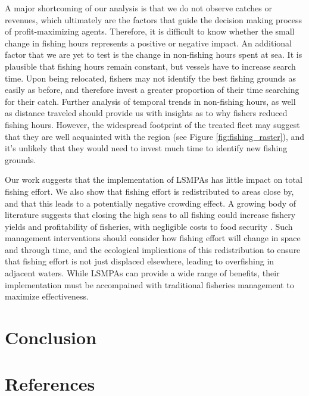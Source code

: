 \documentclass[9pt,twoside,lineno]{pnas-new}
\begin{document}
A major shortcoming of our analysis is that we do not observe catches or
revenues, which ultimately are the factors that guide the decision
making process of profit-maximizing agents. Therefore, it is difficult
to know whether the small change in fishing hours represents a positive or
negative impact. An additional factor that we are yet to test is the
change in non-fishing hours spent at sea. It is plausible that fishing
hours remain constant, but vessels have to increase search time. Upon
being relocated, fishers may not identify the best fishing grounds as
easily as before, and therefore invest a greater proportion of their
time searching for their catch. Further analysis of temporal trends in
non-fishing hours, as well as distance traveled should provide us with
insights as to why fishers reduced fishing hours. However, the
widespread footprint of the treated fleet may suggest that they are well
acquainted with the region (see Figure \ref{fig:fishing_raster}), and it's
unlikely that they would need to invest much time to identify new fishing grounds.

Our work suggests that the implementation of LSMPAs has little impact on
total fishing effort. We also show that fishing effort is
redistributed to areas close by, and that this leads to a potentially
negative crowding effect. A growing body of literature suggests that
closing the high seas to all fishing could increase fishery yields and
profitability of fisheries, with negligible costs to food security
\citep{white_2014,sumaila_2015,sala_2018a,schiller_2018}. Such
management interventions should consider how fishing effort will change
in space and through time, and the ecological implications of this
redistribution to ensure that fishing effort is not just displaced
elsewhere, leading to overfishing in adjacent waters. While LSMPAs can
provide a wide range of benefits, their implementation must be
accompained with traditional fisheries management to maximize
effectiveness.

\section{Conclusion}\label{conclude}

\clearpage

\section{References}\label{references}


\end{document}
